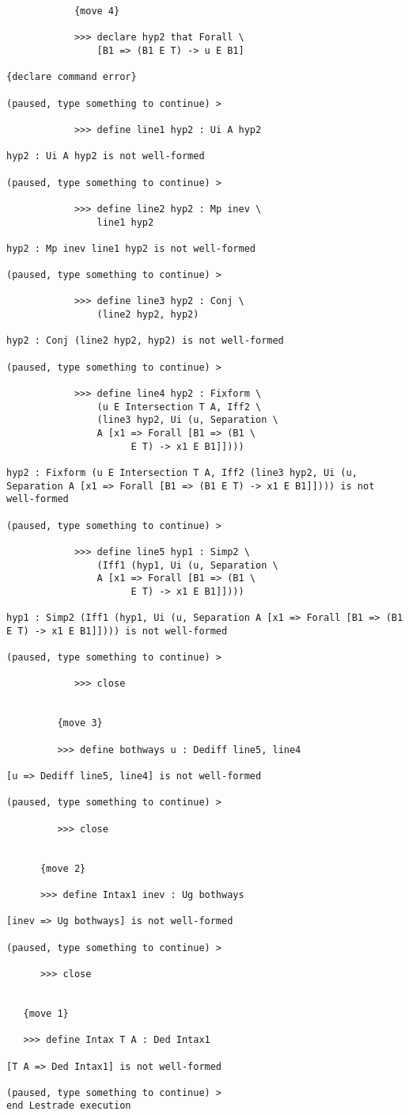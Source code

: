 \documentclass[12pt]{article}
\begin{document}
\begin{verbatim}
            {move 4}

            >>> declare hyp2 that Forall \
                [B1 => (B1 E T) -> u E B1]

{declare command error}

(paused, type something to continue) >

            >>> define line1 hyp2 : Ui A hyp2

hyp2 : Ui A hyp2 is not well-formed

(paused, type something to continue) >

            >>> define line2 hyp2 : Mp inev \
                line1 hyp2

hyp2 : Mp inev line1 hyp2 is not well-formed

(paused, type something to continue) >

            >>> define line3 hyp2 : Conj \
                (line2 hyp2, hyp2)

hyp2 : Conj (line2 hyp2, hyp2) is not well-formed

(paused, type something to continue) >

            >>> define line4 hyp2 : Fixform \
                (u E Intersection T A, Iff2 \
                (line3 hyp2, Ui (u, Separation \
                A [x1 => Forall [B1 => (B1 \
                      E T) -> x1 E B1]])))

hyp2 : Fixform (u E Intersection T A, Iff2 (line3 hyp2, Ui (u, Separation A [x1 => Forall [B1 => (B1 E T) -> x1 E B1]]))) is not well-formed

(paused, type something to continue) >

            >>> define line5 hyp1 : Simp2 \
                (Iff1 (hyp1, Ui (u, Separation \
                A [x1 => Forall [B1 => (B1 \
                      E T) -> x1 E B1]])))

hyp1 : Simp2 (Iff1 (hyp1, Ui (u, Separation A [x1 => Forall [B1 => (B1 E T) -> x1 E B1]]))) is not well-formed

(paused, type something to continue) >

            >>> close


         {move 3}

         >>> define bothways u : Dediff line5, line4

[u => Dediff line5, line4] is not well-formed

(paused, type something to continue) >

         >>> close


      {move 2}

      >>> define Intax1 inev : Ug bothways

[inev => Ug bothways] is not well-formed

(paused, type something to continue) >

      >>> close


   {move 1}

   >>> define Intax T A : Ded Intax1

[T A => Ded Intax1] is not well-formed

(paused, type something to continue) >
end Lestrade execution
\end{verbatim}
\end{document}
